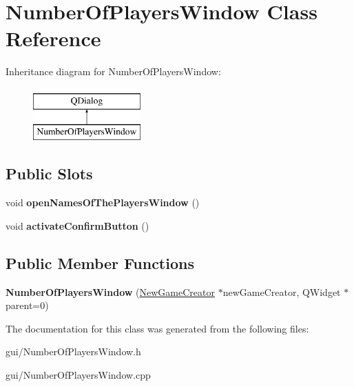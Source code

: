 \hypertarget{classNumberOfPlayersWindow}{}\section{Number\+Of\+Players\+Window Class Reference}
\label{classNumberOfPlayersWindow}
Inheritance diagram for Number\+Of\+Players\+Window\+:\begin{figure}[H]
\begin{center}
\leavevmode
\includegraphics[height=2.000000cm]{classNumberOfPlayersWindow}
\end{center}
\end{figure}
\subsection*{Public Slots}
\begin{DoxyCompactItemize}
\item 
\mbox{\label{classNumberOfPlayersWindow_a43414e8437580ed51cfb461d6b4d21b2}} 
void {\bfseries open\+Names\+Of\+The\+Players\+Window} ()
\item 
\mbox{\label{classNumberOfPlayersWindow_a60722fe1cb6623298543ae168e1fa378}} 
void {\bfseries activate\+Confirm\+Button} ()
\end{DoxyCompactItemize}
\subsection*{Public Member Functions}
\begin{DoxyCompactItemize}
\item 
\mbox{\label{classNumberOfPlayersWindow_a522ce7de553a78ef1514cc988abb8d38}} 
{\bfseries Number\+Of\+Players\+Window} (\hyperlink{classNewGameCreator}{New\+Game\+Creator} $\ast$new\+Game\+Creator, Q\+Widget $\ast$parent=0)
\end{DoxyCompactItemize}


The documentation for this class was generated from the following files\+:\begin{DoxyCompactItemize}
\item 
gui/Number\+Of\+Players\+Window.\+h\item 
gui/Number\+Of\+Players\+Window.\+cpp\end{DoxyCompactItemize}
